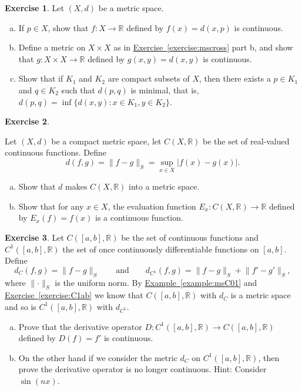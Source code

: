 \documentclass[12pt,openany]{book}
\newcommand{\snorm}[1]{\lVert {#1} \rVert}
\newcommand{\abs}[1]{\left\lvert {#1} \right\rvert}
\newcommand{\R}{{\mathbb{R}}}
\theoremstyle{plain}
\theoremstyle{remark}
\theoremstyle{definition}
\newenvironment{exbox}{%
    \def\FrameCommand{\vrule width 1pt \relax\hspace {10pt}}%
    \MakeFramed {\advance \hsize -\width \FrameRestore }%
}{%
    \endMakeFramed
}
\newenvironment{exparts}{%
    \leavevmode\begin{enumerate}[a),noitemsep,topsep=0pt,parsep=0pt,partopsep=0pt]
}{%
    \end{enumerate}
}
\theoremstyle{exercise}
\newtheorem{exercise}{Exercise}[section]
\theoremstyle{example}
\newcommand{\exerciseref}[1]{\hyperref[#1]{Exercise~\ref*{#1}}}
\newcommand{\exampleref}[1]{\hyperref[#1]{Example~\ref*{#1}}}
\begin{document}
\begin{exbox}
\begin{samepage}
\begin{exercise}
Let $(X,d)$ be a metric space.
\begin{exparts}
\item
If $p \in X$,
show that $f \colon X \to \R$ defined
by $f(x) = d(x,p)$ is continuous.
\item
Define a metric on $X \times X$ as in \exerciseref{exercise:mscross} part
b, and show that $g \colon X \times X \to \R$ defined by
$g(x,y) = d(x,y)$ is continuous.
\item
Show that if $K_1$ and $K_2$ are compact subsets of $X$, then
there exists a $p \in K_1$ and $q \in K_2$ such that $d(p,q)$ is minimal,
that is, $d(p,q) = \inf \{ d(x,y) \colon x \in K_1, y \in K_2 \}$.
\end{exparts}
\end{exercise}
\end{samepage}

\begin{exercise}
\begin{samepage}
Let $(X,d)$ be a compact metric space, let $C(X,\R)$ be the set
of real-valued continuous functions.  Define
\begin{equation*}
d(f,g) = \snorm{f-g}_S = \sup_{x \in X} \abs{f(x)-g(x)} .
\end{equation*}
\begin{exparts}
\item
Show that $d$ makes $C(X,\R)$ into a metric space.
\item
Show that for any $x \in X$, the evaluation function
$E_x \colon C(X,\R) \to \R$ defined by $E_x(f) = f(x)$
is a continuous function.
\end{exparts}
\end{samepage}
\end{exercise}

\begin{samepage}
\begin{exercise}
Let $C([a,b],\R)$ be the set of continuous functions and
$C^1([a,b],\R)$ the set of once continuously differentiable
functions on $[a,b]$.
Define
\begin{equation*}
d_{C}(f,g) = \snorm{f-g}_S
\qquad \text{and} \qquad
d_{C^1}(f,g) = \snorm{f-g}_S + \snorm{f'-g'}_S,
\end{equation*}
where $\snorm{\cdot}_S$ is the uniform norm.
By \exampleref{example:msC01} and \exerciseref{exercise:C1ab} we know that
$C([a,b],\R)$ with $d_C$ is a metric space and
so is
$C^1([a,b],\R)$ with $d_{C^1}$.
\begin{exparts}
\item
Prove that the derivative operator $D \colon 
C^1([a,b],\R) \to C([a,b],\R)$ defined by
$D(f) = f'$ is continuous.
\item
On the other hand if we consider the metric $d_C$ on $C^1([a,b],\R)$,
then prove the derivative operator is no longer continuous.  Hint: Consider
$\sin(n x)$.
\end{exparts}
\end{exercise}
\end{samepage}


\end{exbox}
\end{document}
